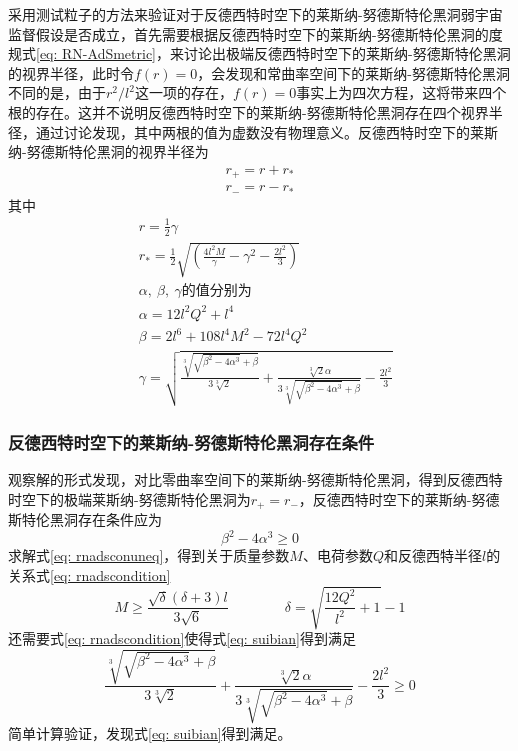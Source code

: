采用测试粒子的方法来验证对于反德西特时空下的莱斯纳-努德斯特伦黑洞弱宇宙监督假设是否成立，首先需要根据反德西特时空下的莱斯纳-努德斯特伦黑洞的度规式\eqref{eq: RN-AdSmetric}，来讨论出极端反德西特时空下的莱斯纳-努德斯特伦黑洞的视界半径，此时令$ f(r)=0 $，会发现和常曲率空间下的莱斯纳-努德斯特伦黑洞不同的是，由于$r^2/l^2$这一项的存在，$ f(r)=0 $事实上为四次方程，这将带来四个根的存在。这并不说明反德西特时空下的莱斯纳-努德斯特伦黑洞存在四个视界半径，通过讨论发现，其中两根的值为虚数没有物理意义。反德西特时空下的莱斯纳-努德斯特伦黑洞的视界半径为
\begin{align}
    r_+=r + r_* \label{eq: rnr+} \\
    r_-=r-r_* \label{eq: rnr-} 
\end{align}
其中
\begin{align*}
    &r = \frac{1}{2} \gamma \\
    &r_* = \frac{1}{2} \sqrt{(\frac{4 l^2
    M}{\gamma}-\gamma^2-\frac{2 l^2}{3})}  \\
    &\alpha,\ \beta,\ \gamma \text{的值分别为} \\
    &\alpha =12 l^2 Q^2+l^4 \\ 
    &\beta =2 l^6 + 108 l^4 M^2 - 72 l^4 Q^2 \\
    &\gamma = \sqrt{\frac{\sqrt[3]{\sqrt{\beta^2-4 \alpha^3}+\beta}}{3\sqrt[3]{2}}+\frac{\sqrt[3]{2} \alpha}{3 \sqrt[3]{\sqrt{\beta^2-4\alpha^3}+\beta}}-\frac{2 l^2}{3}} 
\end{align*}
\subsubsection{反德西特时空下的莱斯纳-努德斯特伦黑洞存在条件}
观察解的形式发现，对比零曲率空间下的莱斯纳-努德斯特伦黑洞，得到反德西特时空下的极端莱斯纳-努德斯特伦黑洞为$r_+=r_-$，反德西特时空下的莱斯纳-努德斯特伦黑洞存在条件应为
\begin{equation}\label{eq: rnadsconuneq}
    \beta^2-4\alpha^3 \geq 0
\end{equation}
求解式\eqref{eq: rnadsconuneq}，得到关于质量参数$M$、电荷参数$Q$和反德西特半径$l$的关系式\eqref{eq: rnadscondition}
\begin{equation}\label{eq: rnadscondition}
    M \geq \frac{\sqrt{\delta } (\delta +3) l}{3 \sqrt{6}} \qquad\qquad  \delta= \sqrt{\frac{12 Q^2}{l^2}+1}-1 
\end{equation}
还需要式\eqref{eq: rnadscondition}使得式\eqref{eq: suibian}得到满足
\begin{equation}\label{eq: suibian}
    \frac{\sqrt[3]{\sqrt{\beta^2-4 \alpha^3}+\beta}}{3\sqrt[3]{2}}+\frac{\sqrt[3]{2} \alpha}{3 \sqrt[3]{\sqrt{\beta^2-4\alpha^3}+\beta}}-\frac{2 l^2}{3} \geq 0
\end{equation}
简单计算验证，发现式\eqref{eq: suibian}得到满足。

